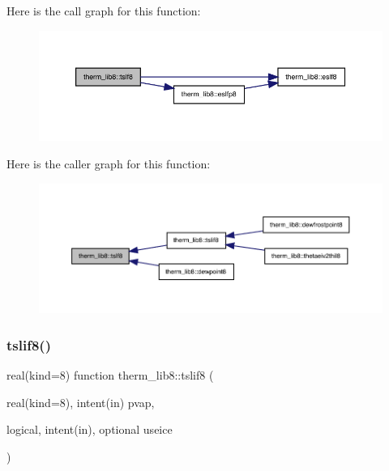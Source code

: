 Here is the call graph for this function\+:
\nopagebreak
\begin{figure}[H]
\begin{center}
\leavevmode
\includegraphics[width=350pt]{namespacetherm__lib8_ad5b9924474672841007e9b1542a87b4e_cgraph}
\end{center}
\end{figure}
Here is the caller graph for this function\+:
\nopagebreak
\begin{figure}[H]
\begin{center}
\leavevmode
\includegraphics[width=350pt]{namespacetherm__lib8_ad5b9924474672841007e9b1542a87b4e_icgraph}
\end{center}
\end{figure}
\mbox{\label{namespacetherm__lib8_ada59a10b18f64fb7eba657201813da06}} 
\subsubsection{\texorpdfstring{tslif8()}{tslif8()}}
{\footnotesize\ttfamily real(kind=8) function therm\+\_\+lib8\+::tslif8 (\begin{DoxyParamCaption}\item[{real(kind=8), intent(in)}]{pvap,  }\item[{logical, intent(in), optional}]{useice }\end{DoxyParamCaption})}

